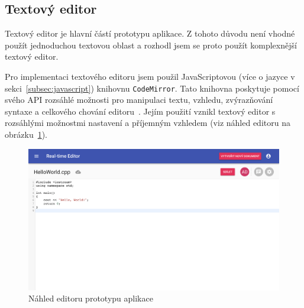 \subsection{Textový editor}\label{subsec:textovýEditor}

Textový editor je hlavní částí prototypu aplikace.
Z tohoto důvodu není vhodné použít jednoduchou textovou oblast a rozhodl jsem se proto použít komplexnější textový editor.

Pro implementaci textového editoru jsem použil JavaScriptovou (více o jazyce v sekci~\ref{subsec:javascript}) knihovnu \texttt{CodeMirror}.
Tato knihovna poskytuje pomocí svého \gls{API} rozsáhlé možnosti pro manipulaci textu, vzhledu, zvýrazňování syntaxe a celkového chování editoru~\cite{codemirror:docs}.
Jejím použití vznikl textový editor s rozsáhlými možnostmi nastavení a příjemným vzhledem (viz náhled editoru na obrázku~\ref{fig:uiEditor}).

\begin{figure}[ht!]
    \centering
    \includegraphics[width=\textwidth]{partials/realizace/uiEditor.png}
    \caption{Náhled editoru prototypu aplikace}\label{fig:uiEditor}
\end{figure}